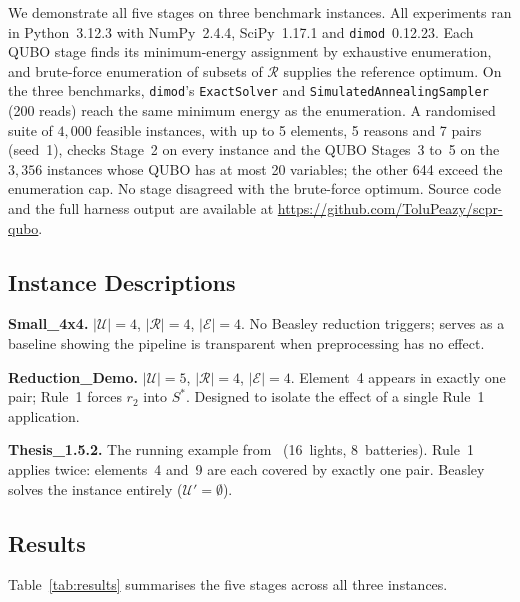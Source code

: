 \documentclass[11pt,a4paper]{article}
\theoremstyle{plain}
\theoremstyle{definition}
\theoremstyle{remark}
\newcommand{\U}{\mathcal{U}}
\newcommand{\R}{\mathcal{R}}
\newcommand{\E}{\mathcal{E}}
\newcommand{\Sstar}{S^{*}}
\newcommand{\QUBO}{\textup{QUBO}}
\newcommand{\abs}[1]{\lvert #1 \rvert}
\begin{document}
We demonstrate all five stages on three benchmark instances.
All experiments ran in Python~3.12.3 with NumPy~2.4.4, SciPy~1.17.1 and
\texttt{dimod}~0.12.23.
Each \QUBO{} stage finds its minimum-energy assignment by exhaustive
enumeration, and brute-force enumeration of subsets of $\R$ supplies the
reference optimum.
On the three benchmarks, \texttt{dimod}'s \texttt{ExactSolver} and
\texttt{SimulatedAnnealingSampler} (200 reads) reach the same minimum energy as
the enumeration.
A randomised suite of $4{,}000$ feasible instances, with up to 5 elements,
5 reasons and 7 pairs (seed~1), checks Stage~2 on every instance and the
\QUBO{} Stages~3 to~5 on the $3{,}356$ instances whose \QUBO{} has at most
20 variables; the other 644 exceed the enumeration cap.
No stage disagreed with the brute-force optimum.
Source code and the full harness output are available at
\url{https://github.com/ToluPeazy/scpr-qubo}.

\subsection{Instance Descriptions}

\textbf{Small\_4x4.}
$\abs{\U} = 4$, $\abs{\R} = 4$, $\abs{\E} = 4$.
No Beasley reduction triggers; serves as a baseline showing the pipeline is
transparent when preprocessing has no effect.

\textbf{Reduction\_Demo.}
$\abs{\U} = 5$, $\abs{\R} = 4$, $\abs{\E} = 4$.
Element~4 appears in exactly one pair; Rule~1 forces $r_2$ into $\Sstar$.
Designed to isolate the effect of a single Rule~1 application.

\textbf{Thesis\_1.5.2.}
The running example from~\cite{babatunde2025thesis} (16~lights, 8~batteries).
Rule~1 applies twice: elements~4 and~9 are each covered by exactly one pair.
Beasley solves the instance entirely ($\U' = \emptyset$).

\subsection{Results}

Table~\ref{tab:results} summarises the five stages across all three instances.
\end{document}
